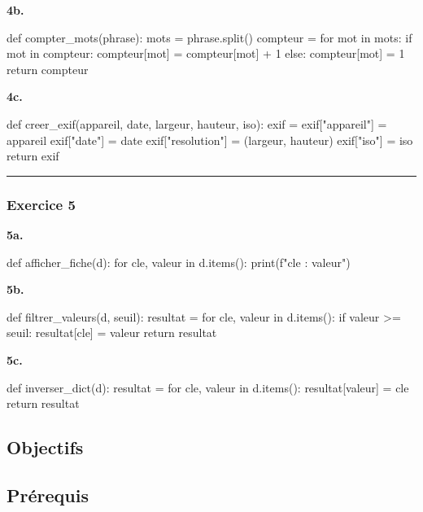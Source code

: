 \textbf{4b.}

\begin{python}
def compter_mots(phrase):
    mots = phrase.split()
    compteur = {}
    for mot in mots:
        if mot in compteur:
            compteur[mot] = compteur[mot] + 1
        else:
            compteur[mot] = 1
    return compteur
\end{python}

\textbf{4c.}

\begin{python}
def creer_exif(appareil, date, largeur, hauteur, iso):
    exif = {}
    exif["appareil"] = appareil
    exif["date"] = date
    exif["resolution"] = (largeur, hauteur)
    exif["iso"] = iso
    return exif
\end{python}

\begin{center}\rule{0.5\linewidth}{0.5pt}\end{center}

\subsubsection{Exercice 5}

\textbf{5a.}

\begin{python}
def afficher_fiche(d):
    for cle, valeur in d.items():
        print(f"{cle} : {valeur}")
\end{python}

\textbf{5b.}

\begin{python}
def filtrer_valeurs(d, seuil):
    resultat = {}
    for cle, valeur in d.items():
        if valeur >= seuil:
            resultat[cle] = valeur
    return resultat
\end{python}

\textbf{5c.}

\begin{python}
def inverser_dict(d):
    resultat = {}
    for cle, valeur in d.items():
        resultat[valeur] = cle
    return resultat
\end{python}

\subsection{Objectifs}

\subsection{Prérequis}

